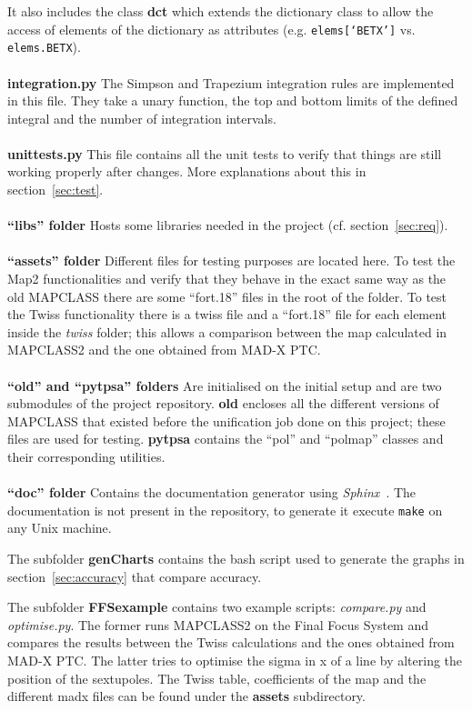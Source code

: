 \documentclass[a4paper]{cernatsnote}
\begin{document}
It also includes the class \textbf{dct} which extends the dictionary
class to allow the access of elements of the dictionary as attributes
(e.g. \texttt{elems[`BETX']} vs. \texttt{elems.BETX}).
\\\\
\textbf{integration.py}
The Simpson and Trapezium integration rules are implemented in this
file. They take a unary function, the top and bottom limits of the
defined integral and the number of integration intervals.
\\\\
\textbf{unittests.py}
This file contains all the unit tests to verify that things are still
working properly after changes. More explanations about this in
section~\ref{sec:test}.
\\\\
\textbf{``libs'' folder}
Hosts some libraries needed in the project (cf.
section~\ref{sec:req}).
\\\\
\textbf{``assets'' folder}
Different files for testing purposes are located here. To test the
Map2 functionalities and verify that they behave in the exact same way
as the old \textsc{MAPCLASS} there are some ``fort.18'' files in the
root of the folder. To test the Twiss functionality there is a twiss
file and a ``fort.18'' file for each element inside the \textit{twiss}
folder; this allows a comparison between the map calculated in
\textsc{MAPCLASS2} and the one obtained from MAD-X PTC.
\\\\
\textbf{``old'' and ``pytpsa'' folders}
Are initialised on the initial setup and are two submodules of the
project repository. \textbf{old} encloses all the different versions
of \textsc{MAPCLASS} that existed before the unification job done on
this project; these files are used for testing. \textbf{pytpsa}
contains the ``pol'' and ``polmap'' classes and their corresponding
utilities.
\\\\
\textbf{``doc'' folder}
Contains the documentation generator using
\textit{Sphinx}~\cite{sphinx}. The documentation is not present in the
repository, to generate it execute \texttt{make} on any Unix machine.

The subfolder \textbf{genCharts} contains the bash script used to
generate the graphs in section~\ref{sec:accuracy} that compare
accuracy.

The subfolder \textbf{FFSexample} contains two example scripts:
\textit{compare.py} and \textit{optimise.py}. The former runs
\textsc{MAPCLASS2} on the Final Focus System and compares the results
between the Twiss calculations and the ones obtained from MAD-X PTC.
The latter tries to optimise the sigma in x of a line by altering the
position of the sextupoles. The Twiss table, coefficients of the map
and the different madx files can be found under the \textbf{assets}
subdirectory.
\end{document}
